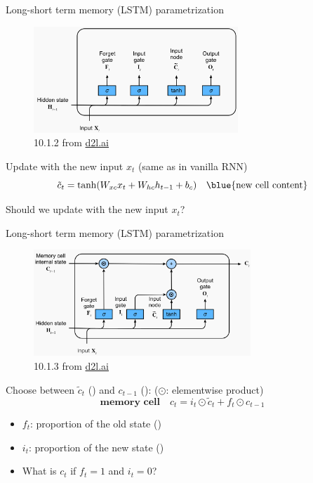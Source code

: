 \documentclass[usenames,dvipsnames,notes,11pt,aspectratio=169,hyperref={colorlinks=true, linkcolor=blue}]{beamer}
\newcommand{\pdfnote}[1]{}
\begin{document}
\begin{frame}
    {Long-short term memory (LSTM) parametrization}
    \begin{figure}
        \includegraphics[height=4cm]{figures/lstm-1}
        \caption{10.1.2 from \href{https://d2l.ai/chapter_recurrent-modern/lstm.html}{d2l.ai}}
    \end{figure}
    \vspace{-1em}

    Update with the new input $x_t$ (same as in vanilla RNN)
    $$
    \tilde{c}_t = \tanh(W_{xc}x_t + W_{hc}h_{t-1} + b_c) \quad \text{\blue{new cell content}}
    $$

    \pause\vspace{-1ex}
    Should we update with the new input $x_t$?
\end{frame}

\begin{frame}
    {Long-short term memory (LSTM) parametrization}
    \begin{figure}
        \includegraphics[height=4cm]{figures/lstm-2}
        \caption{10.1.3 from \href{https://d2l.ai/chapter_recurrent-modern/lstm.html}{d2l.ai}}
    \end{figure}
    \vspace{-1em}

    Choose between $\tilde{c}_t$ () and $c_{t-1}$ (): 
    ($\odot$: elementwise product)
    $$
    \textbf{memory cell} \quad
    c_t = i_t \odot \tilde{c}_t + f_t \odot c_{t-1}
    $$

    \vspace{-1ex}
    \begin{itemize}
        \item $f_t$: proportion of the old state ()
        \item $i_t$: proportion of the new state ()
        \item What is $c_t$ if $f_t=1$ and $i_t=0$?
            \pdfnote{$h_0$}
    \end{itemize}
\end{frame}
\end{document}
